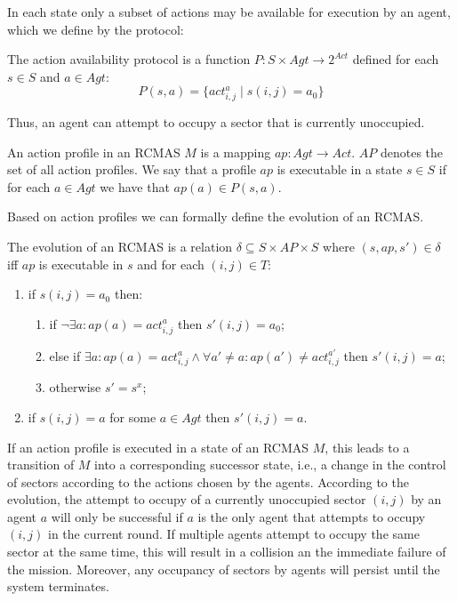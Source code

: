 \documentclass{llncs}
\begin{document}
In each state only a subset of actions may be available for execution by an agent, which we define by the protocol:

\begin{definition}
  The {action availability protocol} is a function $P : S \times Agt \rightarrow 2^{Act}$ defined for each $s \in S$ and $a \in Agt$:
  \[
  P(s,a) = \{ act^a_{i,j} \mid s(i,j) = a_0\}
  \]
\end{definition}
Thus,  an agent can attempt to occupy a sector that is currently unoccupied.
  
  \begin{definition}
  An action profile in an RCMAS $M$ is a mapping $ap : Agt \rightarrow Act$.  $AP$ denotes the set of all action profiles. We say that a profile $ap$ is executable in a state $s \in S$ if for each $a \in Agt$ we have that $ap(a) \in P(s,a)$.
  \end{definition}
 Based on action profiles we can formally define the evolution of an RCMAS.
  
   \begin{definition}[Evolution]
The evolution of an RCMAS is a relation $\delta \subseteq S \times AP \times S$ where $(s, ap, s') \in \delta$ iff $ap$ is executable in $s$ and for each $(i,j) \in T$:
\begin{enumerate}
\item if $s(i,j) = a_0$ then: %
\begin{enumerate}
\item if $\neg \exists a : ap(a) = act^a_{i,j}$ then $s'(i,j) = a_0$;
\item else if $\exists  a : ap(a) = act^a_{i,j} \wedge \forall a' \neq a : ap(a') \neq act^{a'}_{i,j}$ then $s'(i,j) = a$; %
\item otherwise $s' = s^x$; %
\end{enumerate}
\item if $s(i,j) = a$ for some $a \in Agt$ then $s'(i,j) = a$. %
  \end{enumerate}
  \end{definition}
  If an action profile is executed in a state of an RCMAS $M$,  this leads to a transition of $M$ into a corresponding successor state, i.e.,
    a change in the control of sectors according to the actions chosen by the agents. According to the evolution, the attempt to occupy of a currently unoccupied sector $(i,j)$ by an agent $a$ will only be successful if $a$ is the only agent that attempts to occupy $(i,j)$ in the current round. If multiple agents attempt to occupy the same sector at the same time, this will result in a collision an the immediate failure of the mission. 
Moreover, any occupancy of sectors by agents will persist until the system terminates. 
\end{document}
